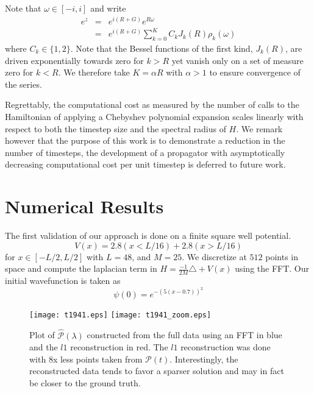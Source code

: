 \documentclass[11pt]{amsart}
\theoremstyle{remark}
\begin{document}
Note that $\omega \in [-i,i]$ and write
\begin{eqnarray}
e^{z} & = & e^{i(R+G)}e^{R\omega} \\
& = & e^{i(R+G)}\sum_{k=0}^K C_k J_k(R) \rho_k(\omega)
\end{eqnarray}
where $C_k \in \{1,2 \} $. Note that the Bessel functions of the first kind, $J_k(R)$, are driven exponentially towards zero for $k>R$ yet vanish only on a set of measure zero for $k<R$. We therefore take $K= \alpha R$ with $\alpha >1$ to ensure convergence of the series.

Regrettably, the computational cost as measured by the number of calls to the Hamiltonian of applying a Chebyshev polynomial expansion scales linearly with respect to both the timestep size and the spectral radius of $H$. We remark however that the purpose of this work is to demonstrate a reduction in the number of timesteps, the development of a propagator with asymptotically decreasing computational cost per unit timestep is deferred to future work.

\section{Numerical Results}

The first validation of our approach is done on a finite square well potential.
\begin{equation}
V(x) = 2.8(x < L/16) + 2.8(x > L/16)
\end{equation} 
for $x \in  [-L/2, L/2]$ with $L=48$, and $M=25$. We discretize at $512$ points in space and compute the laplacian term in $H = \frac{-1}{2M}\triangle + V(x)$ using the FFT. Our initial wavefunction is taken as 
\begin{equation}
\psi(0) = e^{-(5(x-0.7))^2}
\end{equation}


\begin{center}
\begin{figure}
\texttt{[image: t1941.eps]}
\texttt{[image: t1941\_zoom.eps]}
\caption{Plot of $\hat{\mathcal{P}}(\lambda)$ constructed from the full data using an FFT in blue and the $l1$ reconstruction in red. The $l1$ reconstruction was done with 8x less points taken from $\mathcal{P}(t)$. Interestingly, the reconstructed data tends to favor a sparser solution and may in fact be closer to the ground truth.}
\end{figure}
\end{center}
\end{document}
